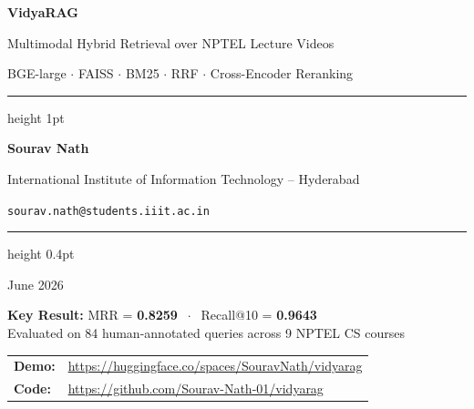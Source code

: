 \documentclass[12pt,a4paper]{article}
\begin{document}
\begin{titlepage}
\centering
\vspace*{1.5cm}
{\Huge\bfseries VidyaRAG\par}
\vspace{0.4cm}
{\Large Multimodal Hybrid Retrieval over NPTEL Lecture Videos\par}
\vspace{0.3cm}
{\large\color{gray} BGE-large $\cdot$ FAISS $\cdot$ BM25 $\cdot$ RRF $\cdot$ Cross-Encoder Reranking\par}
\vspace{1.5cm}
\hrule height 1pt
\vspace{0.8cm}
{\large\bfseries Sourav Nath\par}
\vspace{0.2cm}
{\normalsize International Institute of Information Technology -- Hyderabad\par}
{\normalsize \texttt{sourav.nath@students.iiit.ac.in}\par}
\vspace{0.6cm}
\hrule height 0.4pt
\vspace{0.8cm}
{\normalsize June 2026\par}
\vspace{1cm}

\begin{mdframed}[backgroundcolor=highlight,linecolor=orange!60,linewidth=1pt]
\centering
\textbf{Key Result:} MRR = \textbf{0.8259} $\;\cdot\;$ Recall@10 = \textbf{0.9643}\\
Evaluated on 84 human-annotated queries across 9 NPTEL CS courses
\end{mdframed}

\vspace{1cm}
\begin{tabular}{ll}
\textbf{Demo:} & \url{https://huggingface.co/spaces/SouravNath/vidyarag} \\
\textbf{Code:} & \url{https://github.com/Sourav-Nath-01/vidyarag} \\
\end{tabular}
\end{titlepage}

\tableofcontents
\newpage
\end{document}
